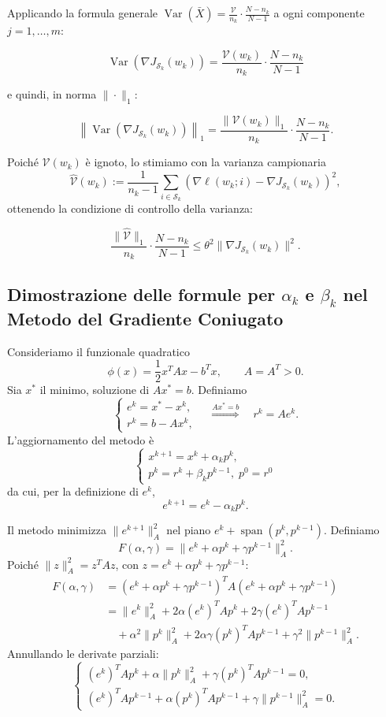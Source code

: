 \documentclass[a4paper,12pt]{article}
\numberwithin{equation}{section}
\numberwithin{figure}{section}
\numberwithin{table}{section}
\begin{document}
Applicando la formula generale $\operatorname{Var}(\bar{X}) = \frac{\mathcal{V}}{n_k}\cdot\frac{N-n_k}{N-1}$ a ogni componente $j=1,\dots,m$:

\[
 \operatorname{Var} \left(\nabla J_{\mathcal{S}_k}(w_k)\right) = \frac{\mathcal{V}(w_k)}{n_k} \cdot \frac{N-n_k}{N-1}
\]

e quindi, in norma $\|\cdot\|_1$:

\[
\left\|\operatorname{Var}\left(\nabla J_{\mathcal{S}_k}(w_k)\right)\right\|_1 = \frac{\|\mathcal{V}(w_k)\|_1}{n_k} \cdot \frac{N-n_k}{N-1}.
\]

Poiché $\mathcal{V}(w_k)$ è ignoto, lo stimiamo con la varianza campionaria
\[
\widehat{\mathcal{V}}(w_k) := \frac{1}{n_k-1}\sum_{i\in\mathcal{S}_k}
\left(\nabla \ell(w_k;i) - \nabla J_{\mathcal{S}_k}(w_k)\right)^2,
\]
ottenendo la condizione di controllo della varianza:

\[
\frac{\|\widehat{\mathcal{V}}\|_1}{n_k} \cdot \frac{N-n_k}{N-1} \le \theta^2 \|\nabla J_{\mathcal{S}_k}(w_k)\|^2.
\]
\newpage

\subsection{Dimostrazione delle formule per $\alpha_k$ e $\beta_k$ nel Metodo del Gradiente Coniugato}
\label{app:cg}

Consideriamo il funzionale quadratico
\[
\phi(x)=\frac12 x^T A x - b^T x, \qquad A=A^T>0. \tag{A.13}\label{eq:A_13}
\]
Sia \(x^*\) il minimo, soluzione di \(Ax^*=b\). Definiamo
\[
\begin{cases}
e^k = x^* - x^k, \\
r^k = b - A x^k,
\end{cases}
\quad\overset{Ax^*=b}{\Longrightarrow}\quad
r^k = A e^k. \tag{A.14}\label{eq:A_14}
\]
L'aggiornamento del metodo è
\[
\begin{cases}
x^{k+1}=x^k+\alpha_k p^k, \\
p^k=r^k+\beta_k p^{k-1},\; p^0=r^0
\end{cases}
\tag{A.15}\label{eq:A_15}
\]
da cui, per la definizione di $e^k$,
\[
e^{k+1}=e^k-\alpha_k p^k. \tag{A.16}\label{eq:A_16}
\]

Il metodo minimizza \(\|e^{k+1}\|_A^2\) nel piano \(e^k+\operatorname{span}(p^k,p^{k-1})\).  
Definiamo
\[
F(\alpha,\gamma)=\|e^k+\alpha p^k+\gamma p^{k-1}\|_A^2. \tag{A.17}\label{eq:A_17}
\]
Poiché \(\|z\|_A^2 = z^T A z\), con \(z=e^k+\alpha p^k+\gamma p^{k-1}\):
\[
\begin{aligned}
F(\alpha,\gamma)
&= (e^k+\alpha p^k+\gamma p^{k-1})^T A (e^k+\alpha p^k+\gamma p^{k-1}) \\
&= \|e^k\|_A^2+2\alpha(e^k)^T A p^k+2\gamma(e^k)^T A p^{k-1}\\
&\quad+\alpha^2\|p^k\|_A^2+2\alpha\gamma(p^k)^T A p^{k-1}+\gamma^2\|p^{k-1}\|_A^2.
\end{aligned} \tag{A.18}\label{eq:A_18}
\]
Annullando le derivate parziali:
\[
\begin{cases}
(e^k)^T A p^k+\alpha\|p^k\|_A^2+\gamma(p^k)^T A p^{k-1}=0,\\[2pt]
(e^k)^T A p^{k-1}+\alpha(p^k)^T A p^{k-1}+\gamma\|p^{k-1}\|_A^2=0.
\end{cases} \tag{A.19}\label{eq:A_19}
\]
\end{document}
